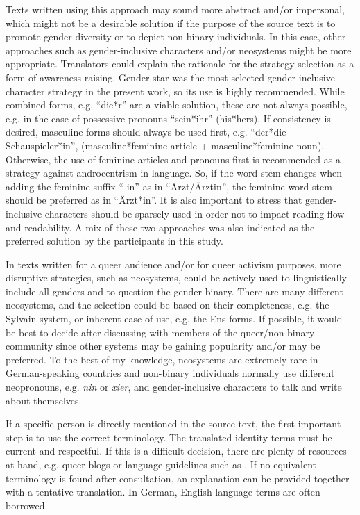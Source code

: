 Texts written using this approach may sound more abstract and/or impersonal, which might not be a desirable solution if the purpose of the source text is to promote gender diversity or to depict non-binary individuals. In this case, other approaches such as gender-inclusive characters and/or neosystems might be more appropriate. Translators could explain the rationale for the strategy selection as a form of awareness raising. Gender star was the most selected gender-inclusive character strategy in the present work, so its use is highly recommended. While combined forms, e.g. ``die*r'' are a viable solution, these are not always possible, e.g. in the case of possessive pronouns ``sein*ihr'' (his*hers). If consistency is desired, masculine forms should always be used first, e.g. ``der*die Schauspieler*in'', (masculine*feminine article + masculine*feminine noun). Otherwise, the use of feminine articles and pronouns first is recommended as a strategy against androcentrism in language. So, if the word stem changes when adding the feminine suffix ``-in'' as in ``Arzt/Ärztin'', the feminine word stem should be preferred as in ``Ärzt*in''. It is also important to stress that gender-inclusive characters should be sparsely used in order not to impact reading flow and readability. A mix of these two approaches was also indicated as the preferred solution by the participants in this study.

In texts written for a queer audience and/or for queer activism purposes, more disruptive strategies, such as neosystems, could be actively used to linguistically include all genders and to question the gender binary. There are many different neosystems, and the selection could be based on their completeness, e.g. the Sylvain system, or inherent ease of use, e.g. the Ens-forms. If possible, it would be best to decide after discussing with members of the queer/non-binary community since other systems may be gaining popularity and/or may be preferred. To the best of my knowledge, neosystems are extremely rare in German-speaking countries and non-binary individuals normally use different neopronouns, e.g. \textit{nin} or \textit{xier}, and gender-inclusive characters to talk and write about themselves. 

If a specific person is directly mentioned in the source text, the first important step is to use the correct terminology. The translated identity terms must be current and respectful. If this is a difficult decision, there are plenty of resources at hand, e.g. queer blogs or language guidelines such as \textcite{apagenderenglish}. If no equivalent terminology is found after consultation, an explanation can be provided together with a tentative translation. In German, English language terms are often borrowed.

